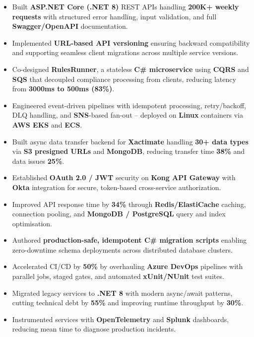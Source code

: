 \documentclass[letterpaper,10pt]{article}
\begin{document}
\begin{itemize}[leftmargin=*]
    \item Built \textbf{ASP.NET Core (.NET 8)} REST APIs handling \textbf{200K+ weekly requests} with structured error handling, input validation, and full \textbf{Swagger/OpenAPI} documentation.
    \item Implemented \textbf{URL-based API versioning} ensuring backward compatibility and supporting seamless client migrations across multiple service versions.
    \item Co-designed \textbf{RulesRunner}, a stateless \textbf{C\# microservice} using \textbf{CQRS} and \textbf{SQS} that decoupled compliance processing from clients, reducing latency from \textbf{3000ms to 500ms (83\%)}.
    \item Engineered event-driven pipelines with idempotent processing, retry/backoff, DLQ handling, and \textbf{SNS}-based fan-out -- deployed on \textbf{Linux} containers via \textbf{AWS EKS} and \textbf{ECS}.
    \item Built async data transfer backend for \textbf{Xactimate} handling \textbf{30+ data types} via \textbf{S3 presigned URLs} and \textbf{MongoDB}, reducing transfer time \textbf{38\%} and data issues \textbf{25\%}.
    \item Established \textbf{OAuth 2.0 / JWT} security on \textbf{Kong API Gateway} with \textbf{Okta} integration for secure, token-based cross-service authorization.
    \item Improved API response time by \textbf{34\%} through \textbf{Redis/ElastiCache} caching, connection pooling, and \textbf{MongoDB / PostgreSQL} query and index optimisation.
    \item Authored \textbf{production-safe, idempotent C\# migration scripts} enabling zero-downtime schema deployments across distributed database clusters.
    \item Accelerated CI/CD by \textbf{50\%} by overhauling \textbf{Azure DevOps} pipelines with parallel jobs, staged gates, and automated \textbf{xUnit/NUnit} test suites.
    \item Migrated legacy services to \textbf{.NET 8} with modern async/await patterns, cutting technical debt by \textbf{55\%} and improving runtime throughput by \textbf{30\%}.
    \item Instrumented services with \textbf{OpenTelemetry} and \textbf{Splunk} dashboards, reducing mean time to diagnose production incidents.
\end{itemize}
\end{document}
